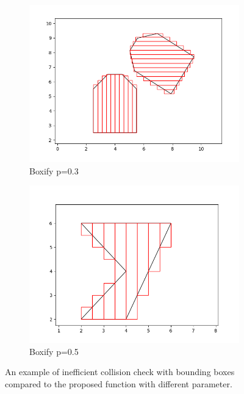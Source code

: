 \documentclass[a4paper,12pt]{article}
\DeclareRobustCommand{\[}{\begin{equation}}
\DeclareRobustCommand{\]}{\end{equation}}
\numberwithin{equation}{section}
\numberwithin{algorithm}{subsection}
\begin{document}
\begin{figure}[H]
\begin{subfigure}[b]{0.4\textwidth}
        \includegraphics[scale=0.3,width=\textwidth]{images/car_boxify_0_3.png}
        \caption{Boxify p=0.3}
    \end{subfigure}
    \begin{subfigure}[b]{0.4\textwidth}
        \includegraphics[scale=0.3,width=\textwidth]{images/concave_boxify.png}
        \caption{Boxify p=0.5}
    \end{subfigure}
    \captionsetup{width=0.6\textwidth}
    \caption{An example of inefficient collision check with bounding boxes compared to the proposed function with different parameter.}
\end{figure}
\end{document}
